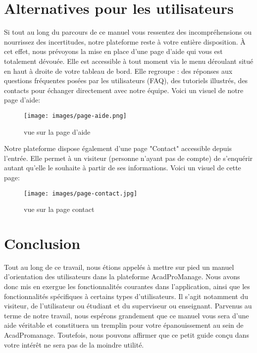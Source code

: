 \documentclass[12pt]{article}
\begin{document}
\newpage
\section{Alternatives pour les utilisateurs}
Si tout au long du parcours de ce manuel vous ressentez des incompréhensions ou nourrissez des incertitudes, notre plateforme reste à votre entière disposition. À cet effet, nous prévoyons la mise en place d'une page d'aide qui vous est totalement dévouée. Elle est accessible à tout moment via le menu déroulant situé en haut à droite de votre tableau de bord. Elle regroupe : des réponses aux questions fréquentes posées par les utilisateurs (FAQ), des tutoriels illustrés, des contacts pour échanger directement avec notre équipe. Voici un visuel de notre page d'aide:
\medskip
    \begin{figure}[h!]
        \centering
        \texttt{[image: images/page-aide.png]}
        \caption{vue sur la page d'aide}
        \label{page d'aide}
    \end{figure}     
\medskip
\newline
Notre plateforme dispose également d'une page "Contact" accessible depuis l'entrée. Elle permet à un visiteur (personne n'ayant pas de compte) de s'enquérir autant qu'elle le souhaite à partir de ses informations. Voici un visuel de cette page:
        
        \begin{figure}[h!]
            \centering
            \texttt{[image: images/page-contact.jpg]}
            \caption{vue sur la page contact}
            \label{page contact}
        \end{figure}     
\newpage
{\fontsize{14}{16}\section*{Conclusion}}

Tout au long de ce travail, nous étions appelés à mettre sur pied un manuel d'orientation des utilisateurs dans la plateforme AcadProManage. Nous avons donc mis en exergue les fonctionnalités courantes dans l'application, ainsi que les fonctionnalités spécifiques à certains types d'utilisateurs. Il s'agit notamment du visiteur, de l'utilisateur ou étudiant et du superviseur ou enseignant. Parvenus au terme de notre travail, nous espérons grandement que ce manuel vous sera d'une aide véritable et constituera un tremplin pour votre épanouissement au sein de AcadPromanage. Toutefois, nous pouvons affirmer que ce petit guide conçu dans votre intérêt ne sera pas de la moindre utilité.
\end{document}
